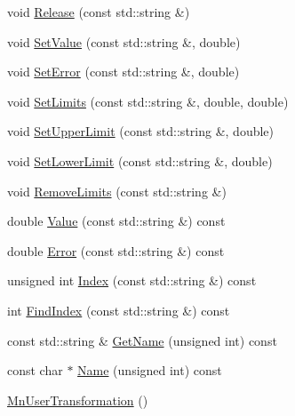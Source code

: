 \begin{DoxyCompactItemize}
\item 
void \mbox{\hyperlink{classROOT_1_1Minuit2_1_1MnUserTransformation_ac9272ca2d514e879f59b0bb7dcbf9906}{Release}} (const std\+::string \&)
\item 
void \mbox{\hyperlink{classROOT_1_1Minuit2_1_1MnUserTransformation_a30717c0bcc5206cc957e505b9cfd64fd}{Set\+Value}} (const std\+::string \&, double)
\item 
void \mbox{\hyperlink{classROOT_1_1Minuit2_1_1MnUserTransformation_ae63d2c7ee55629e691973082b1099e30}{Set\+Error}} (const std\+::string \&, double)
\item 
void \mbox{\hyperlink{classROOT_1_1Minuit2_1_1MnUserTransformation_ae00c15c6e7def8b4c1c1c9d44b52e647}{Set\+Limits}} (const std\+::string \&, double, double)
\item 
void \mbox{\hyperlink{classROOT_1_1Minuit2_1_1MnUserTransformation_aabe0a301a7d6f7fc322afcc4544e1129}{Set\+Upper\+Limit}} (const std\+::string \&, double)
\item 
void \mbox{\hyperlink{classROOT_1_1Minuit2_1_1MnUserTransformation_aebc0f6d54f3ae5d58b86435529c16796}{Set\+Lower\+Limit}} (const std\+::string \&, double)
\item 
void \mbox{\hyperlink{classROOT_1_1Minuit2_1_1MnUserTransformation_ae5e9a3037483cfc354b739ef44cd1867}{Remove\+Limits}} (const std\+::string \&)
\item 
double \mbox{\hyperlink{classROOT_1_1Minuit2_1_1MnUserTransformation_a89cf5aca1d345e0d2d069ad6a54ff94d}{Value}} (const std\+::string \&) const
\item 
double \mbox{\hyperlink{classROOT_1_1Minuit2_1_1MnUserTransformation_a176d46b9b3b58479a92145e7f9293143}{Error}} (const std\+::string \&) const
\item 
unsigned int \mbox{\hyperlink{classROOT_1_1Minuit2_1_1MnUserTransformation_aa4173a2f341790d8e61635eeed2555bb}{Index}} (const std\+::string \&) const
\item 
int \mbox{\hyperlink{classROOT_1_1Minuit2_1_1MnUserTransformation_a9bccf4b65c979cb6b959f8fb787f676a}{Find\+Index}} (const std\+::string \&) const
\item 
const std\+::string \& \mbox{\hyperlink{classROOT_1_1Minuit2_1_1MnUserTransformation_aa2b1548a49a6289914e4cde2fd40d780}{Get\+Name}} (unsigned int) const
\item 
const char $\ast$ \mbox{\hyperlink{classROOT_1_1Minuit2_1_1MnUserTransformation_aabd7adf5448aa905598b93a6d633e0ac}{Name}} (unsigned int) const
\item 
\mbox{\hyperlink{classROOT_1_1Minuit2_1_1MnUserTransformation_aabec69c71600612db11554ed60a76e21}{Mn\+User\+Transformation}} ()

\end{DoxyCompactItemize}
